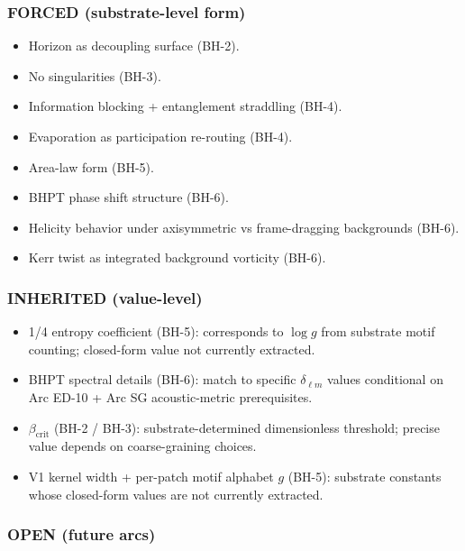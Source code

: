 \documentclass[
  11pt,
  a4paper,
]{article}
\providecommand{\tightlist}{%
  \setlength{\itemsep}{0pt}\setlength{\parskip}{0pt}}
\begin{document}
\subsubsection{FORCED (substrate-level
form)}\label{forced-substrate-level-form}

\begin{itemize}
\tightlist
\item
  Horizon as decoupling surface (BH-2).
\item
  No singularities (BH-3).
\item
  Information blocking + entanglement straddling (BH-4).
\item
  Evaporation as participation re-routing (BH-4).
\item
  Area-law form (BH-5).
\item
  BHPT phase shift structure (BH-6).
\item
  Helicity behavior under axisymmetric vs frame-dragging backgrounds
  (BH-6).
\item
  Kerr twist as integrated background vorticity (BH-6).
\end{itemize}

\subsubsection{INHERITED (value-level)}\label{inherited-value-level}

\begin{itemize}
\tightlist
\item
  1/4 entropy coefficient (BH-5): corresponds to \(\log g\) from
  substrate motif counting; closed-form value not currently extracted.
\item
  BHPT spectral details (BH-6): match to specific \(\delta_{\ell m}\)
  values conditional on Arc ED-10 + Arc SG acoustic-metric
  prerequisites.
\item
  \(\beta_\mathrm{crit}\) (BH-2 / BH-3): substrate-determined
  dimensionless threshold; precise value depends on coarse-graining
  choices.
\item
  V1 kernel width + per-patch motif alphabet \(g\) (BH-5): substrate
  constants whose closed-form values are not currently extracted.
\end{itemize}

\subsubsection{OPEN (future arcs)}\label{open-future-arcs}
\end{document}
